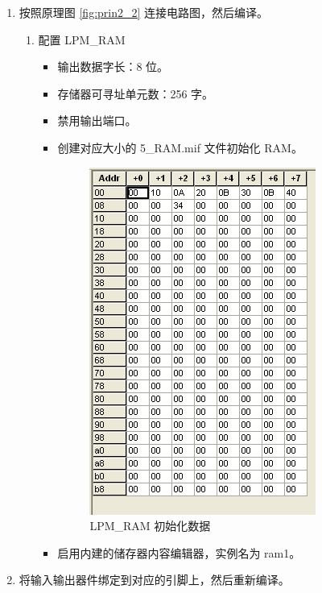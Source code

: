 \begin{enumerate}
    \item 按照原理图 \ref{fig:prin2_2} 连接电路图，然后编译。
    
    \begin{enumerate}
        \item 配置 LPM\_RAM
        
        \begin{itemize}
            \item 输出数据字长：8 位。
            \item 存储器可寻址单元数：256 字。
            \item 禁用输出端口。
            \item 创建对应大小的 5\_RAM.mif 文件初始化 RAM。
            
            \begin{figure}[H]
            \centering
            \includegraphics{images/init2_2.png}
            \caption{LPM\_RAM 初始化数据}
            \label{fig:init2_2}
            \end{figure}
            
            \item 启用内建的储存器内容编辑器，实例名为 ram1。
        \end{itemize}
        
    \end{enumerate}
    
    \item 将输入输出器件绑定到对应的引脚上，然后重新编译。
    

\end{enumerate}
